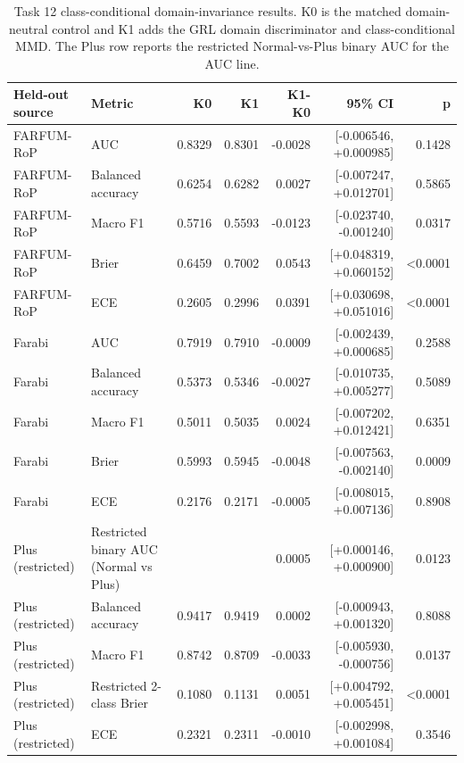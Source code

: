 \begin{table}[htbp]
\centering
\small
\caption{Task 12 class-conditional domain-invariance results. K0 is the matched domain-neutral control and K1 adds the GRL domain discriminator and class-conditional MMD. The Plus row reports the restricted Normal-vs-Plus binary AUC for the AUC line.}
\label{tab:task12}
\begin{tabular}{p{3.6cm}p{5.0cm}rrrrr}
\toprule
Held-out source & Metric & K0 & K1 & K1-K0 & 95\% CI & p \\
\midrule
FARFUM-RoP & AUC & 0.8329 & 0.8301 & -0.0028 & [-0.006546, +0.000985] & 0.1428 \\
FARFUM-RoP & Balanced accuracy & 0.6254 & 0.6282 & 0.0027 & [-0.007247, +0.012701] & 0.5865 \\
FARFUM-RoP & Macro F1 & 0.5716 & 0.5593 & -0.0123 & [-0.023740, -0.001240] & 0.0317 \\
FARFUM-RoP & Brier & 0.6459 & 0.7002 & 0.0543 & [+0.048319, +0.060152] & <0.0001 \\
FARFUM-RoP & ECE & 0.2605 & 0.2996 & 0.0391 & [+0.030698, +0.051016] & <0.0001 \\
Farabi & AUC & 0.7919 & 0.7910 & -0.0009 & [-0.002439, +0.000685] & 0.2588 \\
Farabi & Balanced accuracy & 0.5373 & 0.5346 & -0.0027 & [-0.010735, +0.005277] & 0.5089 \\
Farabi & Macro F1 & 0.5011 & 0.5035 & 0.0024 & [-0.007202, +0.012421] & 0.6351 \\
Farabi & Brier & 0.5993 & 0.5945 & -0.0048 & [-0.007563, -0.002140] & 0.0009 \\
Farabi & ECE & 0.2176 & 0.2171 & -0.0005 & [-0.008015, +0.007136] & 0.8908 \\
Plus (restricted) & Restricted binary AUC (Normal vs Plus) &  &  & 0.0005 & [+0.000146, +0.000900] & 0.0123 \\
Plus (restricted) & Balanced accuracy & 0.9417 & 0.9419 & 0.0002 & [-0.000943, +0.001320] & 0.8088 \\
Plus (restricted) & Macro F1 & 0.8742 & 0.8709 & -0.0033 & [-0.005930, -0.000756] & 0.0137 \\
Plus (restricted) & Restricted 2-class Brier & 0.1080 & 0.1131 & 0.0051 & [+0.004792, +0.005451] & <0.0001 \\
Plus (restricted) & ECE & 0.2321 & 0.2311 & -0.0010 & [-0.002998, +0.001084] & 0.3546 \\
\bottomrule
\end{tabular}
\end{table}
